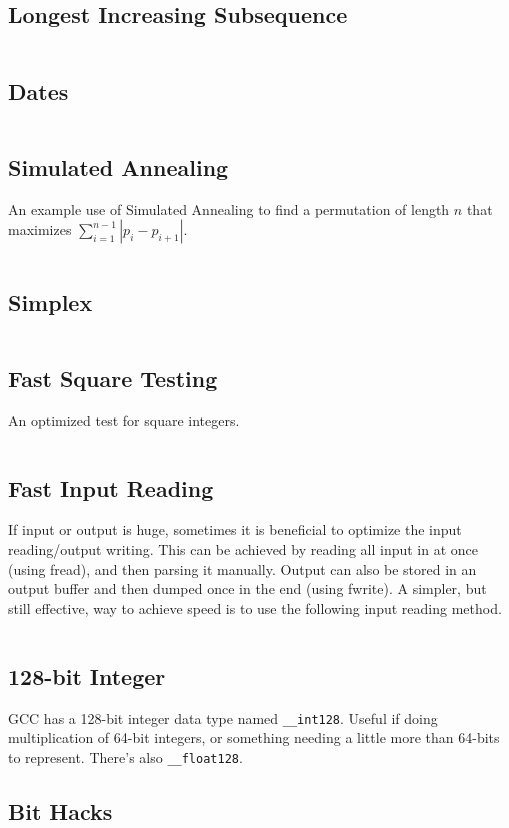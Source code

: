 \documentclass[8pt,a4paper,landscape,oneside]{amsart}
\newcommand{\code}[1]{\inputminted[fontsize=\normalsize,baselinestretch=1]{cpp}{_code/#1}}
\newif\ifverbose
\begin{document}
\begin{multicols*}{3}
  \subsection{Longest Increasing Subsequence}
    \code{other/lis.cpp}
  \subsection{Dates}
    \ifverbose
    Functions to simplify date calculations.
    \fi
    \code{other/dates.cpp}
  \subsection{Simulated Annealing}
    An example use of Simulated Annealing to find a permutation of length $n$
    that maximizes $\sum_{i=1}^{n-1}|p_i - p_{i+1}|$.
    \code{other/simulated_annealing.cpp}
  \subsection{Simplex}
    \code{other/simplex.cpp}
  \subsection{Fast Square Testing}
    An optimized test for square integers.
    \code{tricks/is_square.cpp}
  \subsection{Fast Input Reading}
    If input or output is huge, sometimes it is beneficial to optimize the
    input reading/output writing. This can be achieved by reading all input
    in at once (using fread), and then parsing it manually. Output can also
    be stored in an output buffer and then dumped once in the end (using
    fwrite). A simpler, but still effective, way to achieve speed is to use
    the following input reading method.
    \code{tricks/fast_input.cpp}
  \subsection{128-bit Integer}
    GCC has a 128-bit integer data type named \texttt{\_\_int128}. Useful
    if doing multiplication of 64-bit integers, or something needing a
    little more than 64-bits to represent. There's also
    \texttt{\_\_float128}.
  \subsection{Bit Hacks}
    \code{tricks/snoob.cpp}
\newpage

\end{multicols*}
\end{document}
